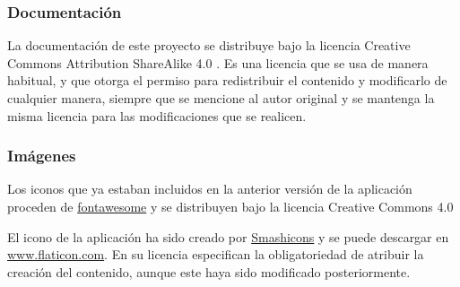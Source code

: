 \subsubsection{Documentación}
La documentación de este proyecto se distribuye bajo la licencia Creative Commons Attribution ShareAlike 4.0 \cite{ccbysa4.0}. Es una licencia que se usa de manera habitual, y que otorga el permiso para redistribuir el contenido y modificarlo de cualquier manera, siempre que se mencione al autor original y se mantenga la misma licencia para las modificaciones que se realicen.

\subsubsection{Imágenes}
Los iconos que ya estaban incluidos en la anterior versión de la aplicación proceden de \href{https://fontawesome.com/icons?d=gallery}{fontawesome} y se distribuyen bajo la licencia Creative Commons 4.0

El icono de la aplicación ha sido creado por \href{https://www.flaticon.com/authors/smashicons}{Smashicons} y se puede descargar en \href{www.flaticon.com}{www.flaticon.com}. En su licencia especifican la obligatoriedad de atribuir la creación del contenido, aunque este haya sido modificado posteriormente.